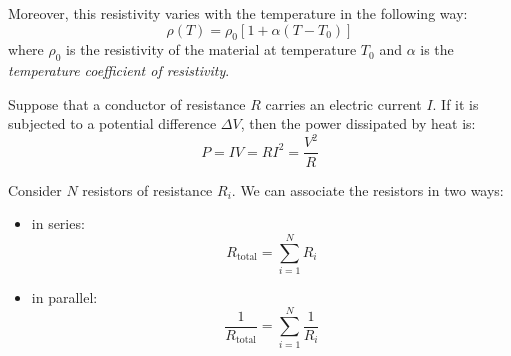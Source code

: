 \documentclass[../../../main.tex]{subfiles}
\begin{document}
\begin{multicols}{2}
\begin{definition}[Resistivity]
        Moreover, this resistivity varies with the temperature in the following way: $$\rho(T)=\rho_0\left[1+\alpha(T-T_0)\right]$$
        where $\rho_0$ is the resistivity of the material at temperature $T_0$ and $\alpha$ is the \textit{temperature coefficient of resistivity}.
    \end{definition}
    \begin{prop}
        Suppose that a conductor of resistance $R$ carries an electric current $I$. If it is subjected to a potential difference $\Delta V$, then the power dissipated by heat is: $$P=IV=RI^2=\frac{V^2}{R}$$
    \end{prop}
    \begin{prop}
        Consider $N$ resistors of resistance $R_i$. We can associate the resistors in two ways:
        \begin{itemize}
            \item in series: $$R_\text{total}=\sum_{i=1}^NR_i$$
            \item in parallel: $$\frac{1}{R_\text{total}}=\sum_{i=1}^N\frac{1}{R_i}$$
        \end{itemize}
    \end{prop}

\end{multicols}
\end{document}
